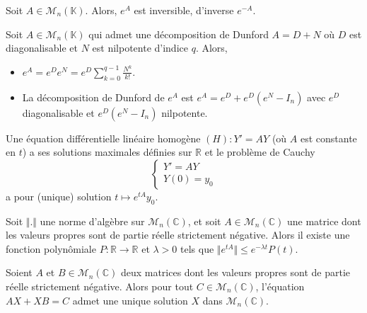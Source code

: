 	\begin{corollary}
		Soit $A \in \mathcal{M}_n(\mathbb{K})$. Alors, $e^A$ est inversible, d'inverse $e^{-A}$.
	\end{corollary}

	\begin{example}
		Soit $A \in \mathcal{M}_n(\mathbb{K})$ qui admet une décomposition de Dunford $A = D+N$ où $D$ est diagonalisable et $N$ est nilpotente d'indice $q$. Alors,
		\begin{itemize}
			\item $e^A = e^D e^N = e^D \sum_{k=0}^{q-1} \frac{N^k}{k!}$.
			\item La décomposition de Dunford de $e^A$ est $e^A = e^D + e^D(e^N - I_n)$ avec $e^D$ diagonalisable et $e^D(e^N - I_n)$ nilpotente.
		\end{itemize}
	\end{example}


	\begin{application}
		Une équation différentielle linéaire homogène $(H) : Y' = AY$ (où $A$ est constante en $t$) a ses solutions maximales définies sur $\mathbb{R}$ et le problème de Cauchy
		\[ \begin{cases} Y' = AY \\ Y(0) = y_0 \end{cases} \]
		a pour (unique) solution $t \mapsto e^{tA} y_0$.
	\end{application}


	\begin{lemma}
		Soit $\Vert . \Vert$ une norme d'algèbre sur $\mathcal{M}_n(\mathbb{C})$, et soit $A \in \mathcal{M}_n(\mathbb{C})$ une matrice dont les valeurs propres sont de partie réelle strictement négative. Alors il existe une fonction polynômiale $P : \mathbb{R} \rightarrow \mathbb{R}$ et $\lambda > 0$ tels que $\Vert e^{tA} \Vert \leq e^{- \lambda t} P(t)$.
	\end{lemma}

	\begin{application}
		Soient $A$ et $B \in \mathcal{M}_n(\mathbb{C})$ deux matrices dont les valeurs propres sont de partie réelle strictement négative. Alors pour tout $C \in \mathcal{M}_n(\mathbb{C})$, l'équation $AX + XB = C$ admet une unique solution $X$ dans $\mathcal{M}_n(\mathbb{C})$.
	\end{application}

